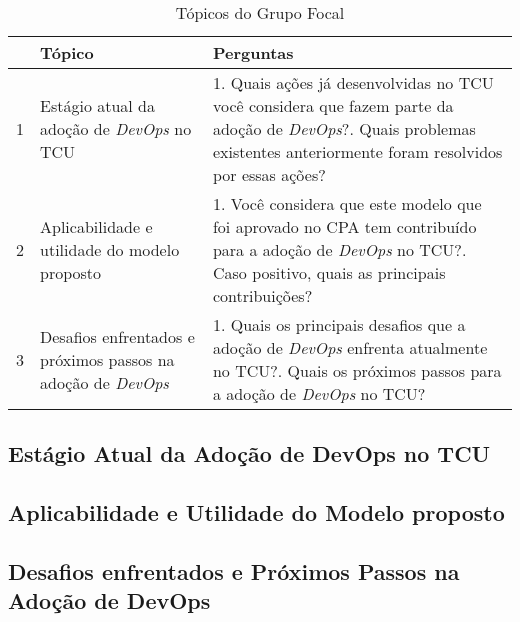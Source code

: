 \begin{table}[hb!]
\centering
\caption{Tópicos do Grupo Focal}
\label{tabela_topicos}
\begin{tabular}{|p{0.3cm}|p{6.4cm}|p{7cm}|} \hline
& \textbf{Tópico} & \textbf{Perguntas} \\ \hline

1 & Estágio atual da adoção de {\it DevOps} no \acrshort{TCU} &
1. Quais ações já desenvolvidas no \acrshort{TCU} você considera que fazem parte da adoção de {\it DevOps}?\newline\newline
2. Quais problemas existentes anteriormente foram resolvidos por essas ações? \\ \hline

2 & Aplicabilidade e utilidade do modelo proposto &
1. Você considera que este modelo que foi aprovado no \acrshort{CPA} tem contribuído para a adoção de {\it DevOps} no \acrshort{TCU}?\newline\newline
2. Caso positivo, quais as principais contribuições? \\ \hline

3 & Desafios enfrentados e próximos passos na adoção de {\it DevOps} &
1. Quais os principais desafios que a adoção de {\it DevOps} enfrenta atualmente no \acrshort{TCU}?\newline\newline
2. Quais os próximos passos para a adoção de {\it DevOps} no \acrshort{TCU}?\\ \hline

\end{tabular}
\end{table}

\subsection{Estágio Atual da Adoção de DevOps no TCU}

\subsection{Aplicabilidade e Utilidade do Modelo proposto}

\subsection{Desafios enfrentados e Próximos Passos na Adoção de DevOps}
